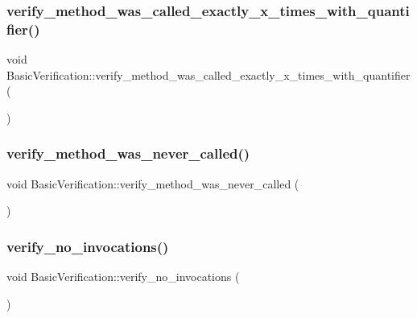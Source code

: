 \subsubsection{\texorpdfstring{verify\_method\_was\_called\_exactly\_x\_times\_with\_quantifier()}{verify\_method\_was\_called\_exactly\_x\_times\_with\_quantifier()}}
{\footnotesize\ttfamily void Basic\+Verification\+::verify\+\_\+method\+\_\+was\+\_\+called\+\_\+exactly\+\_\+x\+\_\+times\+\_\+with\+\_\+quantifier (\begin{DoxyParamCaption}{ }\end{DoxyParamCaption})\hspace{0.3cm}{\ttfamily [inline]}}

\mbox{\label{structBasicVerification_af8dc55dd6126768d8faca2a71870f767}} 
\subsubsection{\texorpdfstring{verify\_method\_was\_never\_called()}{verify\_method\_was\_never\_called()}}
{\footnotesize\ttfamily void Basic\+Verification\+::verify\+\_\+method\+\_\+was\+\_\+never\+\_\+called (\begin{DoxyParamCaption}{ }\end{DoxyParamCaption})\hspace{0.3cm}{\ttfamily [inline]}}

\mbox{\label{structBasicVerification_a6ea28b580177d5ef05b56032ecf3438f}} 
\subsubsection{\texorpdfstring{verify\_no\_invocations()}{verify\_no\_invocations()}}
{\footnotesize\ttfamily void Basic\+Verification\+::verify\+\_\+no\+\_\+invocations (\begin{DoxyParamCaption}{ }\end{DoxyParamCaption})\hspace{0.3cm}{\ttfamily [inline]}}

